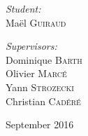 \documentclass[a4paper,10pt]{report}
\newcommand{\reportauthor}{Maël \textsc{Guiraud }} %
\begin{document}
\begin{titlepage}
\begin{center}
\begin{minipage}[t]{0.3\textwidth}
  \begin{flushleft} \large
    \emph{Student:}\\
    \reportauthor 
  \end{flushleft}
\end{minipage}
\begin{minipage}[t]{0.6\textwidth}
  \begin{flushright} \large
    \emph{Supervisors:} \\
    Dominique \textsc{Barth} \\
    Olivier \textsc{Marcé} \\
    Yann \textsc{Strozecki} \\
    Christian \textsc{Cadéré} \\

  \end{flushright}
\end{minipage}

\vfill

{\large September 2016}

\end{center}

\end{titlepage}

\newpage
\null
\newpage
\tableofcontents
\end{document}
